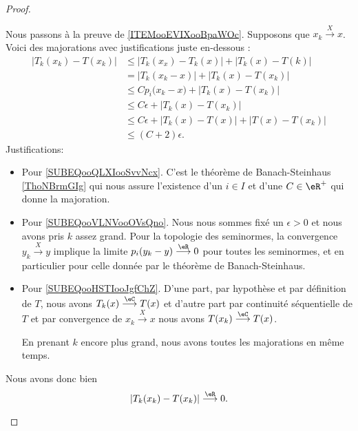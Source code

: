 \begin{proof}
\begin{subproof}
		Nous passons à la preuve de \ref{ITEMooEVIXooBpaWOc}. Supposons que \( x_k\stackrel{X}{\longrightarrow}x\). Voici des majorations avec justifications juste en-dessous :
		\begin{subequations}
			\begin{align}
				| T_k(x_k)-T(x_k) | & \leq | T_{k}(x_{x})-T_{k}(x) |+| T_{k}(x)-T(k) |                                     \\
				                    & =| T_k(x_k-x) |+| T_{k}(x)-T(x_{k}) |                                                \\
				                    & \leq C p_i\big( x_{k}-x \big) + | T_{k}(x)-T(x_k) |      \label{SUBEQooQLXIooSvvNcx} \\
				                    & \leq C \epsilon +    | T_{k}(x)-T(x_{k}) |          \label{SUBEQooVLNVooOVsQno}      \\
				                    & \leq C \epsilon    +| T_{k}(x)-T(x) |+| T(x)-T(x_{k}) |                              \\
				                    & \leq (C+2)\epsilon.        \label{SUBEQooHSTIooJgfChZ}
			\end{align}
		\end{subequations}
		Justifications:
		\begin{itemize}
			\item Pour \eqref{SUBEQooQLXIooSvvNcx}. C'est le théorème de Banach-Steinhaus \ref{ThoNBrmGIg} qui nous assure l'existence d'un \( i\in I\) et d'une \( C\in \eR^+\) qui donne la majoration.
			\item Pour \eqref{SUBEQooVLNVooOVsQno}. Nous nous sommes fixé un \( \epsilon>0\) et nous avons pris \( k\) assez grand. Pour la topologie des seminormes, la convergence \( y_k\stackrel{X}{\longrightarrow}y\) implique la limite \( p_i(y_k-y)\stackrel{\eR}{\longrightarrow}0\) pour toutes les seminormes, et en particulier pour celle donnée par le théorème de Banach-Steinhaus.
			\item Pour \eqref{SUBEQooHSTIooJgfChZ}. D'une part, par hypothèse et par définition de \( T\), nous avons \( T_{k}(x)\stackrel{\eC}{\longrightarrow}T(x)\) et d'autre part par continuité séquentielle de \( T\) et par convergence de \( x_{k}\stackrel{X}{\longrightarrow}x\) nous avons \( T(x_{k})\stackrel{\eC}{\longrightarrow} T(x)\).

			      En prenant \( k\) encore plus grand, nous avons toutes les majorations en même temps.
		\end{itemize}
		Nous avons donc bien
		\begin{equation}
			| T_{k}(x_{k})-T(x_{k}) |\stackrel{\eR}{\longrightarrow}0.
		\end{equation}


\end{subproof}
\end{proof}
